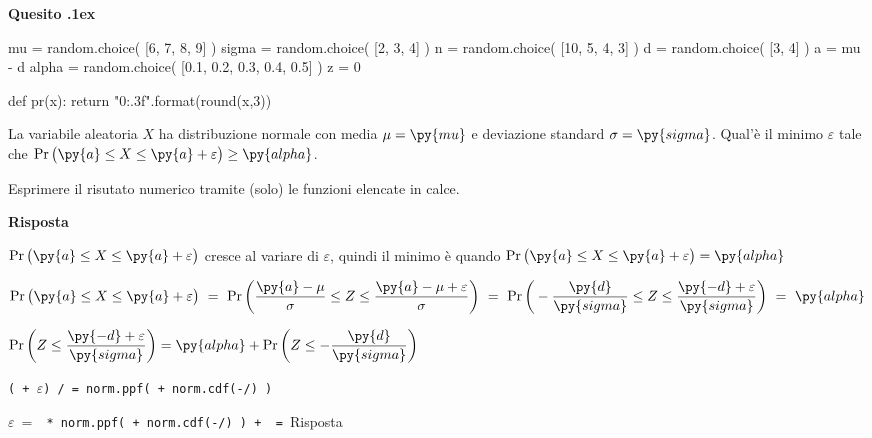 \documentclass[11pt,twoside,a4paper]{article}
\def\Pr{{\rm Pr\,}}
\newcounter{quesito}
\newenvironment{question}{\addtocounter{quesito}{1}\bigskip\bigskip\par\textbf{Quesito \thequesito.\kern1ex}}{\vspace{\parskip}}
\newenvironment{answer}{\par\textbf{Risposta\quad}}{\vspace{\parskip}}
\begin{document}
\begin{question} %
\begin{pycode}
mu = random.choice( [6, 7, 8, 9] )
sigma = random.choice( [2, 3, 4] )
n = random.choice( [10, 5, 4, 3] )
d = random.choice( [3, 4] )
a = mu - d 
alpha = random.choice( [0.1, 0.2, 0.3, 0.4, 0.5] )
z = 0

def pr(x):
    return "{0:.3f}".format(round(x,3))
\end{pycode}
La variabile aleatoria $X$ ha distribuzione normale con media $\mu=\py{mu}$ e deviazione standard $\sigma=\py{sigma}$. Qual'è il minimo $\varepsilon$ tale che $\Pr\big(\py{a}\le X\le\py{a}+\varepsilon\big)\ge\py{alpha}$.

Esprimere il risutato numerico tramite (solo) le funzioni elencate in calce. 
\begin{answer}

$\Pr\big(\py{a}\le X\le\py{a}+\varepsilon\big)$ cresce al variare di $\varepsilon$, quindi il minimo è quando $\Pr\big(\py{a}\le X\le\py{a}+\varepsilon\big)=\py{alpha}$\medskip

$\Pr\big(\py{a}\le X\le\py{a}+\varepsilon\big)
\ =\ 
\Pr\bigg(\dfrac{\py{a}-\mu}{\sigma}\le Z\le\dfrac{\py{a}-\mu+\varepsilon}{\sigma}\bigg)
\ =\ 
\Pr\bigg(-\dfrac{\py{d}}{\py{sigma}}\le Z\le\dfrac{\py{-d}+\varepsilon}{\py{sigma}}\bigg)\ =\ \py{alpha}$

$\Pr\bigg(Z\le\dfrac{+\varepsilon}{}\bigg) = +\Pr\bigg(Z\le-\dfrac{}{}\bigg)$\medskip

{\tt(\py{-d} + $\varepsilon$) /  = norm.ppf(  + norm.cdf(-/) ) }\medskip

$\varepsilon\ =\ ${\color{blue}\tt  \py{sigma} * norm.ppf( \py{alpha} + norm.cdf(-/\py{sigma}) ) + \py{d} }{\tt\ =\ }{\color{blue}\hfill Risposta}

\end{answer}
\end{question}
\end{document}
